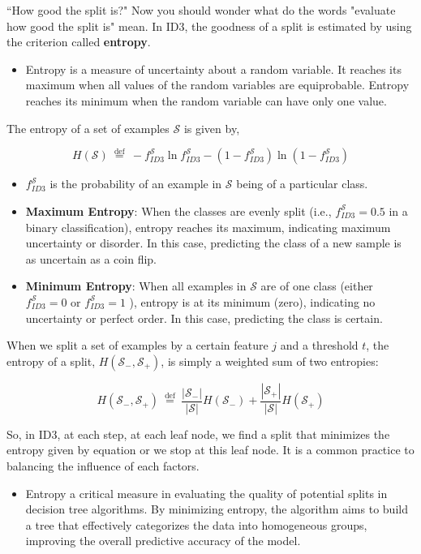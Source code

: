 \documentclass[9pt,dvipsnames]{beamer}
\begin{document}
	\begin{frame}{``How good the split is?"}
		Now you should wonder what do the words "evaluate how good the split is" mean. In ID3, the goodness of a split is estimated by using the criterion called \textbf{entropy}.
		\begin{itemize}
			\item Entropy is a measure of uncertainty about a random variable. It reaches its maximum when all values of the random variables are equiprobable. Entropy reaches its minimum when the random variable can have only one value.
		\end{itemize}
		 The entropy of a set of examples $\mathcal{S}$ is given by,
		
		$$
		H(\mathcal{S}) \stackrel{\text { def }}{=}-f_{I D 3}^{\mathcal{S}} \ln f_{I D 3}^{\mathcal{S}}-\left(1-f_{I D 3}^{\mathcal{S}}\right) \ln \left(1-f_{I D 3}^{\mathcal{S}}\right)
		$$
		\begin{itemize}
			\item \(f_{I D 3}^{\mathcal{S}}\) is the probability of an example in $\mathcal{S}$ being of a particular class.
			\item \textbf{Maximum Entropy}: When the classes are evenly split (i.e., $f_{I D 3}^{\mathcal{S}}=0.5$ in a binary classification), entropy reaches its maximum, indicating maximum uncertainty or disorder. In this case, predicting the class of a new sample is as uncertain as a coin flip.
			\item \textbf{Minimum Entropy}: When all examples in $\mathcal{S}$ are of one class (either $f_{I D 3}^{\mathcal{S}}=0$ or $f_{I D 3}^{\mathcal{S}}=1$ ), entropy is at its minimum (zero), indicating no uncertainty or perfect order. In this case, predicting the class is certain.
		\end{itemize}
	\end{frame}
	
	\begin{frame}
		When we split a set of examples by a certain feature $j$ and a threshold $t$, the entropy of a split, $H\left(\mathcal{S}_{-}, \mathcal{S}_{+}\right)$, is simply a weighted sum of two entropies:
		
		$$
		H\left(\mathcal{S}_{-}, \mathcal{S}_{+}\right) \stackrel{\text { def }}{=} \frac{\left|\mathcal{S}_{-}\right|}{|\mathcal{S}|} H\left(\mathcal{S}_{-}\right)+\frac{\left|\mathcal{S}_{+}\right|}{|\mathcal{S}|} H\left(\mathcal{S}_{+}\right)
		$$
		
		So, in ID3, at each step, at each leaf node, we find a split that minimizes the entropy given by equation or we stop at this leaf node. It is a common practice to balancing the influence of each factors.
		\begin{itemize}
			\item Entropy a critical measure in evaluating the quality of potential splits in decision tree algorithms. By minimizing entropy, the algorithm aims to build a tree that effectively categorizes the data into homogeneous groups, improving the overall predictive accuracy of the model.
		\end{itemize}
	\end{frame}
	
\end{document}
